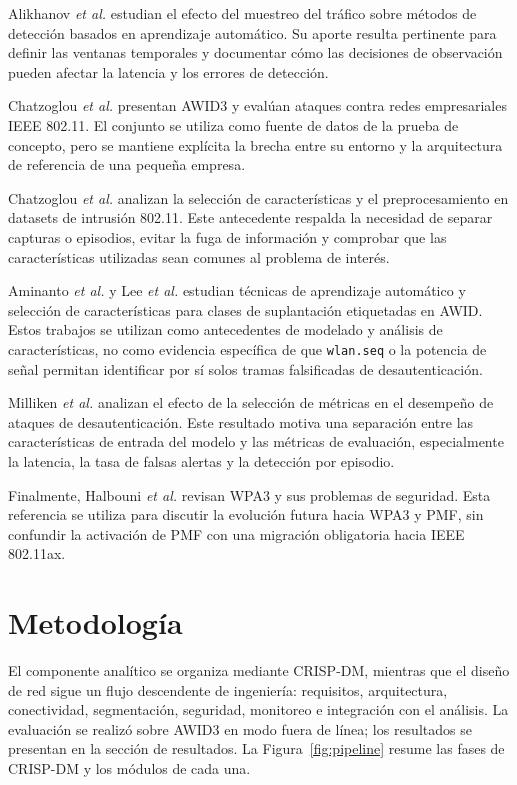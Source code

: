 \documentclass[journal]{IEEEtran}
\begin{document}
Alikhanov \textit{et al.} \cite{alikhanov2022} estudian el efecto del muestreo del tráfico sobre métodos de detección basados en aprendizaje automático. Su aporte resulta pertinente para definir las ventanas temporales y documentar cómo las decisiones de observación pueden afectar la latencia y los errores de detección.

Chatzoglou \textit{et al.} \cite{chatzoglou2021} presentan AWID3 y evalúan ataques contra redes empresariales IEEE 802.11. El conjunto se utiliza como fuente de datos de la prueba de concepto, pero se mantiene explícita la brecha entre su entorno y la arquitectura de referencia de una pequeña empresa.

Chatzoglou \textit{et al.} \cite{pick2022} analizan la selección de características y el preprocesamiento en datasets de intrusión 802.11. Este antecedente respalda la necesidad de separar capturas o episodios, evitar la fuga de información y comprobar que las características utilizadas sean comunes al problema de interés.

Aminanto \textit{et al.} \cite{aminanto2018} y Lee \textit{et al.} \cite{impact2020} estudian técnicas de aprendizaje automático y selección de características para clases de suplantación etiquetadas en AWID. Estos trabajos se utilizan como antecedentes de modelado y análisis de características, no como evidencia específica de que \texttt{wlan.seq} o la potencia de señal permitan identificar por sí solos tramas falsificadas de desautenticación.

Milliken \textit{et al.} \cite{milliken2013} analizan el efecto de la selección de métricas en el desempeño de ataques de desautenticación. Este resultado motiva una separación entre las características de entrada del modelo y las métricas de evaluación, especialmente la latencia, la tasa de falsas alertas y la detección por episodio.

Finalmente, Halbouni \textit{et al.} \cite{halbouni2023} revisan WPA3 y sus problemas de seguridad. Esta referencia se utiliza para discutir la evolución futura hacia WPA3 y PMF, sin confundir la activación de PMF con una migración obligatoria hacia IEEE 802.11ax.

\section{Metodología}

El componente analítico se organiza mediante CRISP-DM, mientras que el diseño de red sigue un flujo descendente de ingeniería: requisitos, arquitectura, conectividad, segmentación, seguridad, monitoreo e integración con el análisis. La evaluación se realizó sobre AWID3 en modo fuera de línea; los resultados se presentan en la sección de resultados. La Figura~\ref{fig:pipeline} resume las fases de CRISP-DM y los módulos de cada una.
\end{document}
